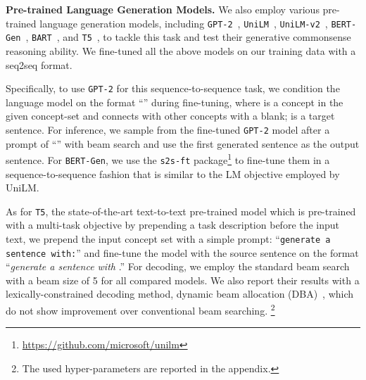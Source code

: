 \documentclass[11pt,a4paper]{article}
\begin{document}
\smallskip
\noindent
\textbf{Pre-trained Language Generation Models.}
We also employ various pre-trained language generation models, including \texttt{GPT-2}~\cite{radford2019language}, \texttt{UniLM}~\cite{Dong2019UnifiedLM},
\texttt{UniLM-v2}~\cite{bao2020unilmv2},
\texttt{BERT-Gen}~\cite{bao2020unilmv2}, 
\texttt{BART}~\cite{Lewis2019BARTDS}, and \texttt{T5}~\cite{raffel2019exploring}, to tackle this task and test their generative commonsense reasoning ability.
We fine-tuned all the above models on our training data with a seq2seq format.

Specifically, to use \texttt{GPT-2} for this sequence-to-sequence task, we condition the language model
on the format ``\textit{}'' during fine-tuning, where  is a concept in the given concept-set and connects with other concepts with a blank;  is a target sentence.
For inference, we sample from the fine-tuned
\texttt{GPT-2} model after a prompt of ``\textit{}'' with beam search and use the first generated
sentence as the output sentence. 
For \texttt{BERT-Gen}, we use the \texttt{s2s-ft} package\footnote{\small{\url{https://github.com/microsoft/unilm}}} to fine-tune them in a sequence-to-sequence fashion that is similar to the LM objective employed by UniLM.

As for \texttt{T5}, the state-of-the-art text-to-text pre-trained model which is pre-trained with a multi-task objective by prepending a task description before the input text, we prepend the input concept set with a simple prompt: ``\texttt{generate a sentence with:}'' and fine-tune the model with the source sentence on the format ``\textit{generate a sentence with }.'' For decoding, we employ the standard beam search with a beam size of 5 for all compared models.
We also report their results with a lexically-constrained decoding method, dynamic beam allocation (DBA)~\cite{post-vilar-2018-fast}, which do not show improvement over conventional beam searching.
\footnote{The used hyper-parameters are reported in the appendix. }
\end{document}
